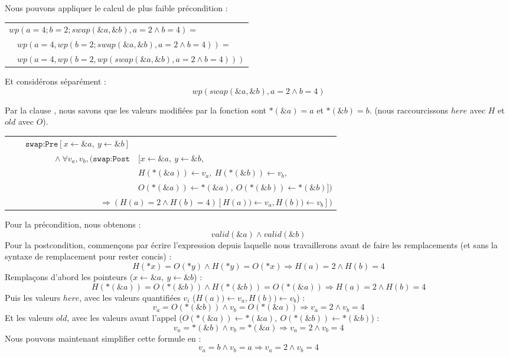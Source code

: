 Nous pouvons appliquer le calcul de plus faible précondition :

\begin{tabular}{l}
  $wp(a = 4; b = 2; swap(\&a, \&b), a = 2 \wedge b = 4) = $\\
  $\quad wp(a = 4, wp(b = 2; swap(\&a, \&b), a = 2 \wedge b = 4)) = $\\
  $\quad wp(a = 4, wp(b = 2, wp(swap(\&a, \&b), a = 2 \wedge b = 4)))$
\end{tabular}


Et considérons séparément :
$$wp(swap(\&a, \&b), a = 2 \wedge b = 4)$$


Par la clause , nous savons que les valeurs modifiées par la
fonction sont $*(\&a) = a$ et $*(\&b) = b$. (nous raccourcissons $here$ avec $H$
et $old$ avec $O$).

\begin{tabular}{rl}
  $\quad \quad \texttt{swap:Pre}[x \leftarrow \&a,\ y \leftarrow \&b]$ & \\
  $\quad \wedge \forall v_a, v_b,(\texttt{swap:Post}$ & $ [ x \leftarrow \&a,\ y \leftarrow \&b, $ \\
                               & $H(*(\&a)) \leftarrow v_a,\ H(*(\&b)) \leftarrow v_b,$ \\
                               & $O(*(\&a)) \leftarrow *(\&a),\ O(*(\&b)) \leftarrow *(\&b)])$\\
  \multicolumn{2}{r}{$\quad \quad \Rightarrow (H(a) = 2 \wedge H(b) = 4)[H(a)) \leftarrow v_a, H(b)) \leftarrow v_b])$}
\end{tabular}


Pour la précondition, nous obtenons :
$$valid(\&a) \wedge valid(\&b)$$
Pour la postcondition, commençons par écrire l'expression depuis laquelle nous
travaillerons avant de faire les remplacements (et sans la syntaxe de remplacement
pour rester concis) :
$$H(*x) = O(*y) \wedge H(*y) = O(*x) \Rightarrow H(a) = 2 \wedge H(b) = 4$$
Remplaçons d'abord les pointeurs ($x \leftarrow \&a,\ y \leftarrow \&b$) :
$$H(*(\&a)) = O(*(\&b)) \wedge H(*(\&b)) = O(*(\&a)) \Rightarrow H(a) = 2 \wedge H(b) = 4$$
Puis les valeurs $here$, avec les valeurs quantifiées $v_i$ ($H(a)) \leftarrow v_a, H(b)) \leftarrow v_b$) :
$$v_a = O(*(\&b)) \wedge v_b = O(*(\&a)) \Rightarrow v_a = 2 \wedge v_b = 4$$
Et les valeurs $old$, avec les valeurs avant l'appel ($O(*(\&a)) \leftarrow *(\&a),\ O(*(\&b)) \leftarrow *(\&b)$) :
$$v_a = *(\&b) \wedge v_b = *(\&a) \Rightarrow v_a = 2 \wedge v_b = 4$$
Nous pouvons maintenant simplifier cette formule en :
$$v_a = b \wedge v_b = a \Rightarrow v_a = 2 \wedge v_b = 4$$


